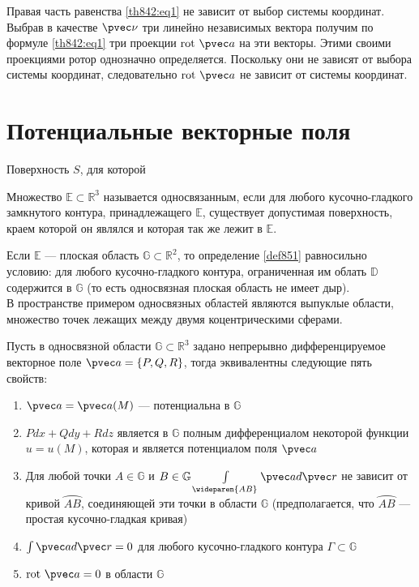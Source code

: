 Правая часть равенства \eqref{th842:eq1} не зависит от выбор системы координат.
Выбрав в качестве $\pvec \nu$ три линейно независимых вектора получим по
формуле \eqref{th842:eq1} три проекции $\mbox{rot} \ \pvec a$ на эти векторы.
Этими своими проекциями ротор однозначно определяется. Поскольку они не зависят
от выбора системы координат, следовательно $\mbox{rot} \ \pvec a$ не зависит от
системы координат.

\section{Потенциальные векторные поля}
Поверхность $S$, для которой
\begin{definition}
  \label{def851}
  Множество $\mathbb{E} \subset \mathbb{R}^3$ называется односвязанным, если
  для любого кусочно-гладкого замкнутого контура, принадлежащего $\mathbb{E}$,
  существует допустимая поверхность, краем которой он являлся и которая так же
  лежит в $\mathbb{E}$. \\
\end{definition}
Если $\mathbb{E}$ --- плоская область $\mathbb{G} \subset \mathbb{R}^2$, то
определение \eqref{def851} равносильно условию: для любого кусочно-гладкого
контура, ограниченная им облать $\mathbb{D}$ содержится в $\mathbb{G}$ (то есть
односвязная плоская область не имеет дыр). \\

В пространстве примером односвязных областей являются выпуклые области,
множество точек лежащих между двумя коцентрическими сферами.

\begin{theorem}
  Пусть в односвязной области $\mathbb{G} \subset \mathbb{R}^3$ задано
  непрерывно дифференцируемое векторное поле $\pvec a = \{P, Q, R\}$, тогда
  эквивалентны следующие пять свойств:
  \begin{enumerate}
    \item $\pvec a = \pvec a(M)$ --- потенциальна в $\mathbb{G}$
    \item $Pdx + Qdy + Rdz$ является в $\mathbb{G}$ полным дифференциалом
      некоторой функции $u = u(M)$, которая и является потенциалом поля $\pvec
      a$
    \item Для любой точки $A \in \mathbb{G}$ и $B \in \mathbb{G}
      \int\limits_{\wideparen{AB}} \pvec a d \pvec r$ не зависит от кривой
      $\wideparen{AB}$, соединяющей эти точки в области $\mathbb{G}$
      (предполагается, что $\wideparen{AB}$ --- простая кусочно-гладкая
      кривая)
    \item $\int \pvec a d \pvec r = 0$ для любого кусочно-гладкого контура
      $\Gamma \subset \mathbb{G}$
    \item $\mbox{rot} \ \pvec a = 0$ в области $\mathbb{G}$
  \end{enumerate}
\end{theorem}

